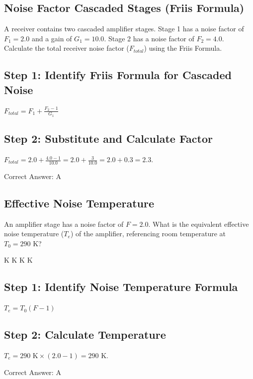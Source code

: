 \clearpage

\subsection{Noise Factor Cascaded Stages (Friis Formula)}

A receiver contains two cascaded amplifier stages. Stage 1 has a noise factor of $F_1 = 2.0$ and a gain of $G_1 = 10.0$. Stage 2 has a noise factor of $F_2 = 4.0$. Calculate the total receiver noise factor ($F_{total}$) using the Friis Formula.

\begin{choices}
\end{choices}

\begin{solution}

\subsection*{Step 1: Identify Friis Formula for Cascaded Noise}
$F_{total} = F_1 + \frac{F_2 - 1}{G_1}$

\subsection*{Step 2: Substitute and Calculate Factor}
$F_{total} = 2.0 + \frac{4.0 - 1}{10.0} = 2.0 + \frac{3}{10.0} = 2.0 + 0.3 = 2.3$.

Correct Answer: A
\end{solution}

\clearpage

\subsection{Effective Noise Temperature}

An amplifier stage has a noise factor of $F = 2.0$. What is the equivalent effective noise temperature ($T_e$) of the amplifier, referencing room temperature at $T_0 = 290\text{ K}$?

\begin{choices}
     K
     K
     K
     K
\end{choices}

\begin{solution}

\subsection*{Step 1: Identify Noise Temperature Formula}
$T_e = T_0 (F - 1)$

\subsection*{Step 2: Calculate Temperature}
$T_e = 290\text{ K} \times (2.0 - 1) = 290\text{ K}$.

Correct Answer: A
\end{solution}

